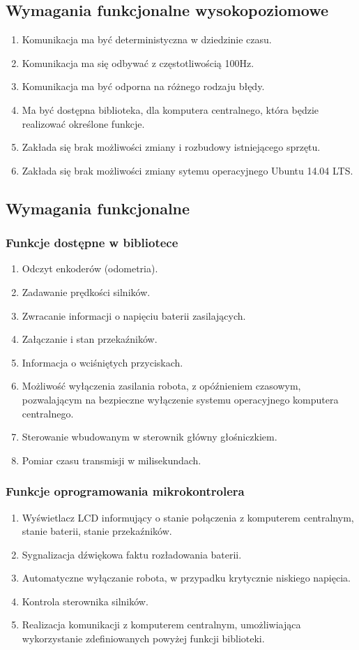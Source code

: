 \documentclass[10pt,a4paper]{article}
\begin{document}
	\subsection{Wymagania funkcjonalne wysokopoziomowe}
	\begin{enumerate}
		\item Komunikacja ma być deterministyczna w dziedzinie czasu.
		\item Komunikacja ma się odbywać z częstotliwością 100Hz.
		\item Komunikacja ma być odporna na różnego rodzaju błędy.
		\item Ma być dostępna biblioteka, dla komputera centralnego, która będzie realizować określone funkcje.
		\item Zakłada się brak możliwości zmiany i rozbudowy istniejącego sprzętu.
		\item Zakłada się brak możliwości zmiany sytemu operacyjnego Ubuntu 14.04 LTS.
	\end{enumerate}
	\subsection{Wymagania funkcjonalne}
	\subsubsection{Funkcje dostępne w bibliotece}
	\begin{enumerate}
		\item Odczyt enkoderów (odometria).
		\item Zadawanie prędkości silników.
		\item Zwracanie informacji o napięciu baterii zasilających.
		\item Załączanie i stan przekaźników.
		\item Informacja o wciśniętych przyciskach.
		\item Możliwość wyłączenia zasilania robota, z opóźnieniem czasowym, pozwalającym na bezpieczne wyłączenie systemu operacyjnego komputera centralnego.
		\item Sterowanie wbudowanym w sterownik główny głośniczkiem.
		\item Pomiar czasu transmisji w milisekundach.
	\end{enumerate} 
	\subsubsection{Funkcje oprogramowania mikrokontrolera}
	\begin{enumerate}
		\item Wyświetlacz LCD informujący o stanie połączenia z komputerem centralnym, stanie baterii, stanie przekaźników.
		\item Sygnalizacja dźwiękowa faktu rozładowania baterii.
		\item Automatyczne wyłączanie robota, w przypadku krytycznie niskiego napięcia.
		\item Kontrola sterownika silników.
		\item Realizacja komunikacji z komputerem centralnym, umożliwiająca wykorzystanie zdefiniowanych powyżej funkcji biblioteki.
	\end{enumerate}
\end{document}
